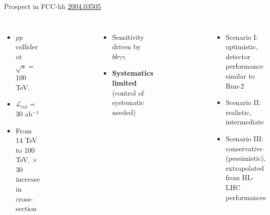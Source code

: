 \begin{frame}{Prospect in FCC-hh}
\href{https://arxiv.org/abs/2004.03505}{2004.03505}
\begin{columns}
\begin{itemize}
    \item $pp$ collider at $\sqrt{s} = $ 100 TeV.
    \item $\mathcal{L}_{int} = $ 30 ab$^{-1}$
    \item From 14 TeV to 100 TeV, $\times$ 30 increase in cross-section 
\end{itemize}

\begin{figure}
    \centering
    \includegraphics[width=0.8\textwidth]{BackUp/Part4/Img/kl_1sigma_FCC.png}
\end{figure}

\begin{itemize}
    \item Sensitivity driven by $b\bar{b}\gamma\gamma$
    \item \textbf{Systematics limited}  (control of systematic needed) 
\end{itemize}


\begin{figure}
    \centering
    \includegraphics[width=0.8\textwidth]{BackUp/Part4/Img/kl_comb_FCC.png}
\end{figure}

\begin{itemize}
    \item Scenario I: optimistic, detector performance similar to Run-2
    \item Scenario II: realistic, intermediate
    \item Scenario III: conservative (pessimistic), extrapolated from HL-LHC performances 
\end{itemize}

\end{columns}
\end{frame}
